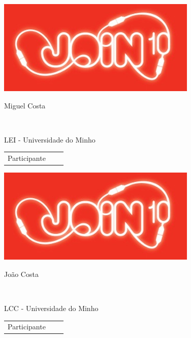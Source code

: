 \documentclass[twocolumn]{article}
\begin{document}
  \vspace{12.5mm} 
 \begin{minipage}{89mm} 
 \includegraphics{design/logo}\\ 
 
 \addvspace{5mm} 
 
 \begin{center} 
 \huge{Miguel Costa} 
 \scriptsize{ 
 \begin{tabular*}{0.75\textwidth}{c} 
 \hline 
 \end{tabular*}}\\ 
LEI - Universidade do Minho
 \end{center} 
 
 \begin{flushright} 
 \begin{tabular}{r l l} 
 \normalsize{Participante} & & 
 \end{tabular} 
 \end{flushright} 
 \end{minipage} 
 
  
 \vspace{13mm} 
 \begin{minipage}{89mm} 
 \includegraphics{design/logo}\\ 
 
 \addvspace{5mm} 
 
 \begin{center} 
 \huge{João Costa} 
 \scriptsize{ 
 \begin{tabular*}{0.75\textwidth}{c} 
 \hline 
 \end{tabular*}}\\ 
LCC - Universidade do Minho
 \end{center} 
 
 \begin{flushright} 
 \begin{tabular}{r l l} 
 \normalsize{Participante} & & 
 \end{tabular} 
 \end{flushright} 
 \end{minipage} 
 
\end{document}
